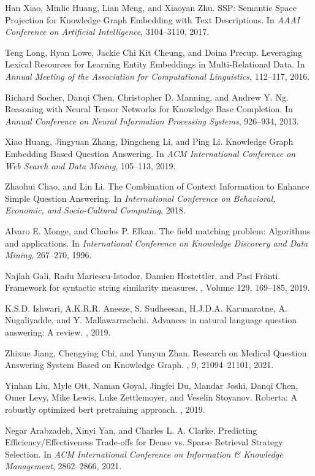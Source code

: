 \documentclass[11pt]{article}
\begin{document}
\begin{thebibliography}{10}
\begin{small}
 Han Xiao, Minlie Huang, Lian Meng, and Xiaoyan Zhu. \newblock  SSP: Semantic Space Projection for Knowledge Graph Embedding with Text Descriptions. \newblock In {\em AAAI Conference on Artificial Intelligence}, 3104--3110, 2017.

 Teng Long, Ryan Lowe, Jackie Chi Kit Cheung, and Doina Precup. \newblock  Leveraging Lexical Resources for Learning Entity Embeddings in Multi-Relational Data. \newblock In {\em Annual Meeting of the Association for Computational Linguistics}, 112--117, 2016.

 Richard Socher, Danqi Chen, Christopher D. Manning, and Andrew Y. Ng. \newblock  Reasoning with Neural Tensor Networks for Knowledge Base Completion. \newblock In {\em Annual Conference on Neural Information Processing Systems}, 926--934, 2013.

 Xiao Huang, Jingyuan Zhang, Dingcheng Li, and Ping Li. \newblock Knowledge Graph Embedding Based Question Answering. \newblock In {\em ACM International Conference on Web Search and Data Mining}, 105--113, 2019.

 Zhaohui Chao, and Lin Li. \newblock  The Combination of Context Information to Enhance Simple Question Answering. \newblock In {\em International Conference on Behavioral, Economic, and Socio-Cultural Computing}, 2018.

 Alvaro E. Monge, and Charles P. Elkan. \newblock The field matching problem: Algorithms and applications. \newblock In {\em International Conference on Knowledge Discovery and Data Mining}, 267--270, 1996.

 Najlah Gali, Radu Mariescu-Istodor, Damien Hostettler, and Pasi Fränti. \newblock  Framework for syntactic string similarity measures.  , Volume 129, 169--185, 2019.

 K.S.D. Ishwari, A.K.R.R. Aneeze, S. Sudheesan, H.J.D.A. Karunaratne, A. Nugaliyadde, and Y. Mallawarrachchi. \newblock  Advances in natural language question answering: A review. , 2019.

 Zhixue Jiang, Chengying Chi, and Yunyun Zhan.  \newblock  Research on Medical Question Answering System Based on Knowledge Graph. , 9, 21094--21101, 2021.

 Yinhan Liu, Myle Ott, Naman Goyal, Jingfei Du, Mandar Joshi, Danqi Chen, Omer Levy, Mike Lewis, Luke Zettlemoyer, and Veselin Stoyanov. \newblock Roberta: A robustly optimized bert pretraining approach.  , 2019.

 Negar Arabzadeh, Xinyi Yan, and Charles L. A. Clarke. \newblock Predicting Efficiency/Effectiveness Trade-offs for Dense vs. Sparse Retrieval Strategy Selection.  \newblock In {\em ACM International Conference on Information \& Knowledge Management}, 2862--2866, 2021.

\end{small}
\end{thebibliography}
\end{document}
